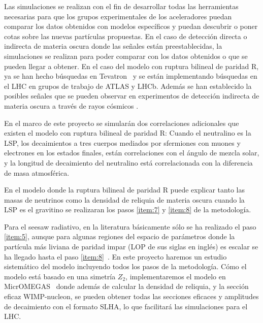 Las simulaciones se realizan con el fin de desarrollar todas las
herramientas necesarias para que los grupos experimentales de los
aceleradores puedan comparar los datos obtenidos con modelos
específicos y puedan descubrir o poner cotas sobre las nuevas
partículas propuestas. En el caso de detección directa o indirecta de
materia oscura donde las señales están preestablecidas, la
simulaciones se realizan para poder comparar con los datos obtenidos o
que se pueden llegar a obtener. En el caso del modelo con ruptura
bilineal de paridad R, ya se han hecho búsquedas en
Tevatron~\cite{Brigliadori:2008vf} y se están implementando búsquedas en el LHC
en grupos de trabajo de ATLAS y LHCb. Además se han establecido la
posibles señales que se pueden observar en experimentos de detección
indirecta de materia oscura a través de rayos cósmicos
\cite{Choi:2010jt}.

\begin{proyecto}
  En el marco de este proyecto se simularán dos correlaciones
  adicionales que existen el modelo con ruptura bilineal de paridad R:
  Cuando el neutralino es la LSP, los decaimientos a tres cuerpos
  mediados por sfermiones con muones y electrones en los estados
  finales, están correlaciones con el ángulo de mezcla solar, y la
  longitud de decaimiento del neutralino está correlacionada con la
  diferencia de masa atmosférica.
\end{proyecto}

\begin{proyecto}
  En el modelo donde la ruptura bilineal de paridad R puede explicar
  tanto las masas de neutrinos como la densidad de reliquia de materia
  oscura cuando la LSP es el gravitino se realizaran los pasos
  \ref{item:7} y \ref{item:8} de la metodología.
\end{proyecto}

\begin{darkmatter}
  \begin{proyecto}
  Para el seesaw radiativo, en la literatura básicamente sólo se ha
  realizado el paso \ref{item:5}, aunque para algunas regiones del
  espacio de parámetros donde la partícula más liviana de paridad
  impar (LOP de sus siglas en inglés) es escalar se ha llegado hasta
  el paso \ref{item:8}~\cite{Bergman:2007pm}. En este proyecto haremos un
  estudio sistemático del modelo incluyendo todos los pasos de la
  metodología. Cómo el modelo está basado en una simetría $Z_2$,
  implementaremos el modelo en MicrOMEGAS~\cite{Belanger:2010gh} donde
  además de calcular la densidad de reliquia, y la sección eficaz
  WIMP-nucleon, se pueden obtener todas las secciones eficaces y
  amplitudes de decaimiento con el formato SLHA, lo que facilitará las
  simulaciones para el LHC.
\end{proyecto}
\end{darkmatter}

